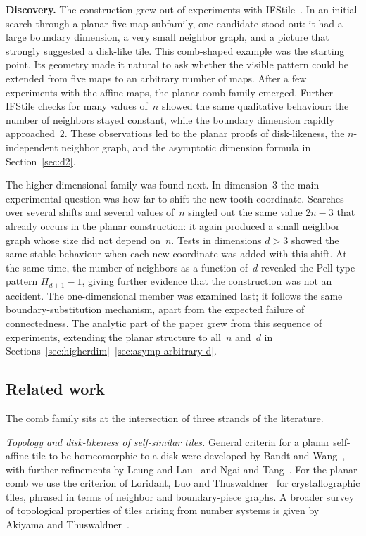 \documentclass{amsart}
\theoremstyle{definition}
\theoremstyle{remark}
\begin{document}
\textbf{Discovery.}
The construction grew out of experiments with IFStile~\cite{ifstile}.
In an initial search through a planar five-map subfamily, one candidate
stood out: it had a large boundary dimension, a very small neighbor
graph, and a picture that strongly suggested a disk-like tile.  This
comb-shaped example was the starting point.  Its geometry made it
natural to ask whether the visible pattern could be extended from five
maps to an arbitrary number of maps.  After a few experiments with the
affine maps, the planar comb family emerged.  Further IFStile checks for
many values of~$n$ showed the same qualitative behaviour: the number of
neighbors stayed constant, while the boundary dimension rapidly
approached~$2$.  These observations led to the planar proofs of
disk-likeness, the $n$-independent neighbor graph, and the asymptotic
dimension formula in Section~\ref{sec:d2}.

The higher-dimensional family was found next.  In dimension~$3$ the main
experimental question was how far to shift the new tooth coordinate.
Searches over several shifts and several values of~$n$ singled out the
same value $2n{-}3$ that already occurs in the planar construction: it
again produced a small neighbor graph whose size did not depend on~$n$.
Tests in dimensions $d>3$ showed the same stable behaviour when each new
coordinate was added with this shift.  At the same time, the number of
neighbors as a function of~$d$ revealed the Pell-type pattern
$H_{d+1}-1$, giving further evidence that the construction was not an
accident.  The one-dimensional member was examined last; it follows the
same boundary-substitution mechanism, apart from the expected failure of
connectedness.  The analytic part of the paper grew from this sequence
of experiments, extending the planar structure to all~$n$ and~$d$ in
Sections~\ref{sec:higherdim}--\ref{sec:asymp-arbitrary-d}.

\subsection*{Related work}

The comb family sits at the intersection of three strands of the
literature.

\emph{Topology and disk-likeness of self-similar tiles.}
General criteria for a planar self-affine tile to be homeomorphic to
a disk were developed by Bandt and Wang~\cite{bandt-wang}, with
further refinements by Leung and Lau~\cite{leung-lau} and Ngai and
Tang~\cite{ngai-tang}.  For the planar comb we use the criterion of
Loridant, Luo and Thuswaldner~\cite{loridant-luo-thuswaldner} for
crystallographic tiles, phrased in terms of neighbor and boundary-piece
graphs.  A broader survey of topological properties of tiles arising
from number systems is given by Akiyama and
Thuswaldner~\cite{akiyama-thuswaldner}.
\end{document}
